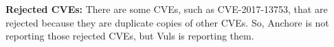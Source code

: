 \documentclass[a4paper,num-refs]{oup-contemporary}
\begin{document}
\textbf{Rejected CVEs:} There are some CVEs, such as CVE-2017-13753, that are rejected because they are duplicate copies of other CVEs. 
	So, Anchore is not reporting those rejected CVEs, but Vuls is reporting them.
\end{document}
